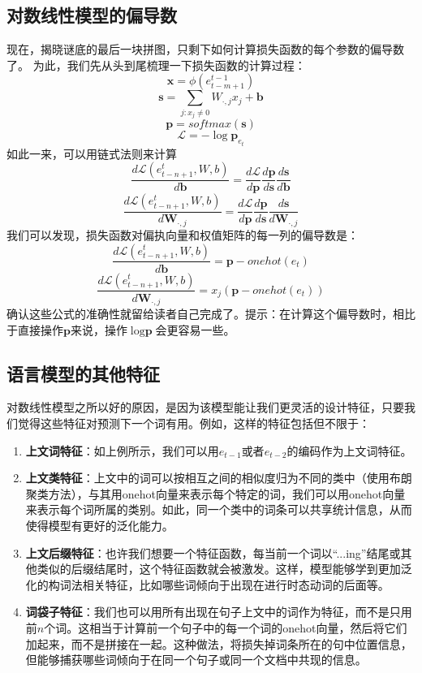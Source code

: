 \documentclass[10pt,a4paper]{ctexart}
\begin{document}
\subsection{对数线性模型的偏导数}
现在，揭晓谜底的最后一块拼图，只剩下如何计算损失函数的每个参数的偏导数了。
为此，我们先从头到尾梳理一下损失函数的计算过程：
\[
 \textbf{x} = \phi (e_{t-m+1}^{t-1})
\]
\[
  \textbf{s} = \sum_{j:x_j \neq 0} W_{\cdot,j}x_j + \textbf{b}
\]
\[
 \textbf{p} = softmax(\textbf{s})
\]
\[
 \mathcal{L} = - \log \textbf{p}_{e_t}
\]
如此一来，可以用链式法则来计算
\[
 \frac{d\mathcal{L}(e_{t-n+1}^t,W,b)}{d\textbf{b}} = \frac{d\mathcal{L}}{d\textbf{p}}\frac{d\textbf{p}}{d\textbf{s}}\frac{d\textbf{s}}{d\textbf{b}}
\]
\[
 \frac{d\mathcal{L}(e_{t-n+1}^t,W,b)}{d\textbf{W}_{\cdot,j}} = \frac{d\mathcal{L}}{d\textbf{p}}\frac{d\textbf{p}}{d\textbf{s}}\frac{d\textbf{s}}{d\textbf{W}_{\cdot,j}}
\]
我们可以发现，损失函数对偏执向量和权值矩阵的每一列的偏导数是：
\[
 \frac{d\mathcal{L}(e_{t-n+1}^t,W,b)}{d\textbf{b}} = \textbf{p} - onehot(e_t)
\]
\[
 \frac{d\mathcal{L}(e_{t-n+1}^t,W,b)}{d\textbf{W}_{\cdot,j}} = x_j (\textbf{p} - onehot(e_t))
\]
确认这些公式的准确性就留给读者自己完成了。提示：在计算这个偏导数时，相比于直接操作$\textbf{p}$来说，操作$\log \textbf{p}$会更容易一些。

\subsection{语言模型的其他特征}
对数线性模型之所以好的原因，是因为该模型能让我们更灵活的设计特征，只要我们觉得这些特征对预测下一个词有用。例如，这样的特征包括但不限于：
\begin{enumerate}
\item[] \textbf{上文词特征}：如上例所示，我们可以用$e_{t-1}$或者$e_{t-2}$的编码作为上文词特征。
\item[] \textbf{上文类特征}：上文中的词可以按相互之间的相似度归为不同的类中（使用布朗聚类方法\cite{brown1992class}），与其用onehot向量来表示每个特定的词，我们可以用onehot向量来表示每个词所属的类别\cite{chen2009shrinking}。如此，同一个类中的词条可以共享统计信息，从而使得模型有更好的泛化能力。
\item[] \textbf{上文后缀特征}：也许我们想要一个特征函数，每当前一个词以“...ing”结尾或其他类似的后缀结尾时，这个特征函数就会被激发。这样，模型能够学到更加泛化的构词法相关特征，比如哪些词倾向于出现在进行时态动词的后面等。
\item[] \textbf{词袋子特征}：我们也可以用所有出现在句子上文中的词作为特征，而不是只用前$n$个词。这相当于计算前一个句子中的每一个词的onehot向量，然后将它们加起来，而不是拼接在一起。这种做法，将损失掉词条所在的句中位置信息，但能够捕获哪些词倾向于在同一个句子或同一个文档中共现的信息。
\end{enumerate}
\end{document}
